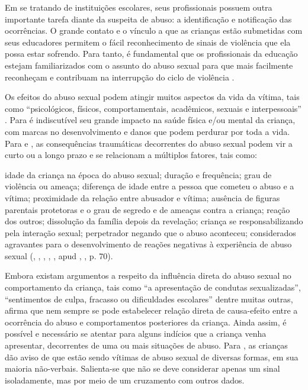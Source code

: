 Em se tratando de instituições escolares, seus profissionais possuem outra importante tarefa diante da suspeita de abuso: a identificação e notificação das ocorrências. O grande contato e o vínculo a que as crianças estão submetidas com seus educadores permitem o fácil reconhecimento de sinais de violência que ela possa estar sofrendo. Para tanto, é fundamental que os profissionais da educação estejam familiarizados com o assunto do abuso sexual para que mais facilmente reconheçam e contribuam na interrupção do ciclo de violência \cite{CHILDHOODBRASIL2009}.

Os efeitos do abuso sexual podem atingir muitos aspectos da vida da vítima, tais como ``psicológicos, físicos, comportamentais, acadêmicos, sexuais e interpessoais'' .  Para  é indiscutível seu grande impacto na saúde física e/ou mental da criança, com marcas no desenvolvimento e danos que podem perdurar por toda a vida. Para  e , as consequências traumáticas decorrentes do abuso sexual podem vir a curto ou a longo prazo e se relacionam a múltiplos fatores, tais como:

\begin{citacao}
	idade da criança na época do abuso sexual; duração e frequência; grau de violência ou ameaça; diferença de idade entre a pessoa que cometeu o abuso e a vítima; proximidade da relação entre abusador e vítima; ausência de figuras parentais protetoras e o grau de segredo e de ameaças contra a criança; reação dos outros; dissolução da família depois da revelação; criança se responsabilizando pela interação sexual; perpetrador negando que o abuso aconteceu; considerados agravantes para o desenvolvimento de reações negativas à experiência de abuso sexual (\citeauthor{FURNISS1993}, \citeyear{FURNISS1993}, \citeauthor{KAPLANSADOCKGREBB1997}, \citeyear{KAPLANSADOCKGREBB1997}, \citeauthor{SANDERSON2005}, \citeyear{SANDERSON2005} apud \citeauthor{HABIGZANG2012}, \citeyear{HABIGZANG2012}, p. 70).
\end{citacao}

Embora existam argumentos a respeito da influência direta do abuso sexual no comportamento da criança, tais como ``a apresentação de condutas sexualizadas'', ``sentimentos de culpa, fracasso ou dificuldades escolares'' dentre muitas outras,  afirma que nem sempre se pode estabelecer relação direta de causa-efeito entre a ocorrência do abuso e comportamentos posteriores da criança. Ainda assim, é possível e necessário se atentar para alguns indícios que a criança venha apresentar, decorrentes de uma ou mais situações de abuso. Para , as crianças dão aviso de que estão sendo vítimas de abuso sexual de diversas formas, em sua maioria não-verbais. Salienta-se que não se deve considerar apenas um sinal isoladamente, mas por meio de um cruzamento com outros dados.

